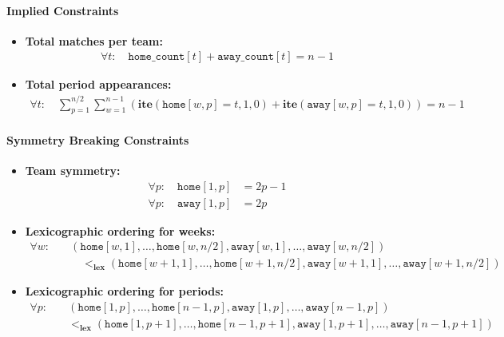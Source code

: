 \documentclass[11pt]{article}
\begin{document}
\paragraph{Implied Constraints}
\begin{itemize}
    \item \textbf{Total matches per team:}
    \begin{align}
        \forall t: \quad \texttt{home\_count}[t] + \texttt{away\_count}[t] = n - 1
    \end{align}

    \item \textbf{Total period appearances:}
    \begin{align}
        \forall t: \quad
        \sum_{p=1}^{n/2} \sum_{w=1}^{n-1} \left( \textbf{ite}(\texttt{home}[w,p] = t, 1, 0) + \textbf{ite}(\texttt{away}[w,p] = t, 1, 0) \right) = n - 1
    \end{align}
\end{itemize}

\paragraph{Symmetry Breaking Constraints}
\begin{itemize}
    \item \textbf{Team symmetry:}
    \begin{align}
        \forall p: \quad \texttt{home}[1,p] &= 2p - 1 \\
        \forall p: \quad \texttt{away}[1,p] &= 2p
    \end{align}

    \item \textbf{Lexicographic ordering for weeks:}
    \begin{align}
        \forall w: \quad
        &(\texttt{home}[w,1], \ldots, \texttt{home}[w,n/2], \texttt{away}[w,1], \ldots, \texttt{away}[w,n/2]) \\
        &\quad <_{\textbf{lex}} (\texttt{home}[w+1,1], \ldots, \texttt{home}[w+1,n/2], \texttt{away}[w+1,1], \ldots, \texttt{away}[w+1,n/2]) \nonumber
    \end{align}

    \item \textbf{Lexicographic ordering for periods:}
    \begin{align}
        \forall p: \quad
        &(\texttt{home}[1,p], \ldots, \texttt{home}[n-1,p], \texttt{away}[1,p], \ldots, \texttt{away}[n-1,p]) \\
        & <_{\textbf{lex}} (\texttt{home}[1,p+1], \ldots, \texttt{home}[n-1,p+1], \texttt{away}[1,p+1], \ldots, \texttt{away}[n-1,p+1]) \nonumber
    \end{align}
\end{itemize}
\end{document}
